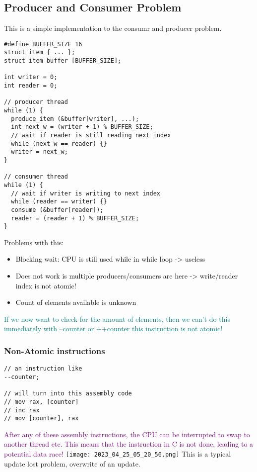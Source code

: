 \documentclass[main.tex,fontsize=8pt,paper=a4,paper=portrait,DIV=calc,]{scrartcl}
\begin{document}
\subsection{Producer and Consumer Problem}
This is a simple implementation to the consumr and producer problem.
\begin{lstlisting}
#define BUFFER_SIZE 16
struct item { ... };
struct item buffer [BUFFER_SIZE];

int writer = 0;
int reader = 0;

// producer thread
while (1) {
  produce_item (&buffer[writer], ...);
  int next_w = (writer + 1) % BUFFER_SIZE;
  // wait if reader is still reading next index
  while (next_w == reader) {}
  writer = next_w;
}

// consumer thread
while (1) {
  // wait if writer is writing to next index
  while (reader == writer) {}
  consume (&buffer[reader]);
  reader = (reader + 1) % BUFFER_SIZE;
}
\end{lstlisting}
Problems with this: 
\begin{itemize}
\item \textcolor{black}{Blocking wait: CPU is still used while in while loop -> useless}
\item \textcolor{black}{Does not work is multiple producers/consumers are here -> write/reader index is not atomic!}
\item \textcolor{black}{Count of elements available is unknown}
\end{itemize} 
\textcolor{teal}{If we now want to check for the amount of elements, then we can't do this immediately with --counter or ++counter\newline
this instruction is not atomic!}

\subsubsection{Non-Atomic instructions}
\begin{lstlisting}
// an instruction like
--counter;

// will turn into this assembly code
// mov rax, [counter]
// inc rax
// mov [counter], rax
\end{lstlisting}
\textcolor{purple}{After any of these assembly instructions, the CPU can be interrupted to swap to another thread etc.\newline
This means that the instruction in C is not done, leading to a potential data race!}\newline
\texttt{[image: 2023\_04\_25\_05\_20\_56.png]}\newline
This is a typical update lost problem, overwrite of an update.
\end{document}
